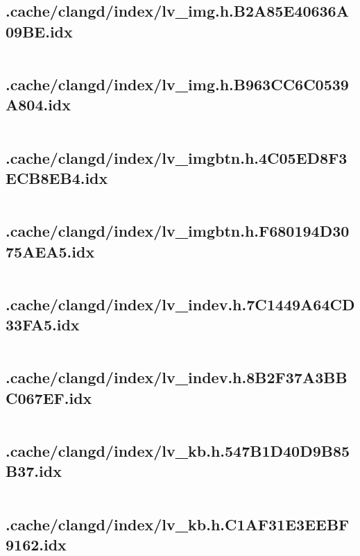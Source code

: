 \subsection{.cache/clangd/index/lv_img.h.B2A85E40636A09BE.idx}
\inputminted[linenos,tabsize=2,breaklines, breakanywhere]{c}{lv_img.h.B2A85E40636A09BE.idx}
\pagebreak

\subsection{.cache/clangd/index/lv_img.h.B963CC6C0539A804.idx}
\inputminted[linenos,tabsize=2,breaklines, breakanywhere]{c}{lv_img.h.B963CC6C0539A804.idx}
\pagebreak

\subsection{.cache/clangd/index/lv_imgbtn.h.4C05ED8F3ECB8EB4.idx}
\inputminted[linenos,tabsize=2,breaklines, breakanywhere]{c}{lv_imgbtn.h.4C05ED8F3ECB8EB4.idx}
\pagebreak

\subsection{.cache/clangd/index/lv_imgbtn.h.F680194D3075AEA5.idx}
\inputminted[linenos,tabsize=2,breaklines, breakanywhere]{c}{lv_imgbtn.h.F680194D3075AEA5.idx}
\pagebreak

\subsection{.cache/clangd/index/lv_indev.h.7C1449A64CD33FA5.idx}
\inputminted[linenos,tabsize=2,breaklines, breakanywhere]{c}{lv_indev.h.7C1449A64CD33FA5.idx}
\pagebreak

\subsection{.cache/clangd/index/lv_indev.h.8B2F37A3BBC067EF.idx}
\inputminted[linenos,tabsize=2,breaklines, breakanywhere]{c}{lv_indev.h.8B2F37A3BBC067EF.idx}
\pagebreak

\subsection{.cache/clangd/index/lv_kb.h.547B1D40D9B85B37.idx}
\inputminted[linenos,tabsize=2,breaklines, breakanywhere]{c}{lv_kb.h.547B1D40D9B85B37.idx}
\pagebreak

\subsection{.cache/clangd/index/lv_kb.h.C1AF31E3EEBF9162.idx}
\inputminted[linenos,tabsize=2,breaklines, breakanywhere]{c}{lv_kb.h.C1AF31E3EEBF9162.idx}
\pagebreak

